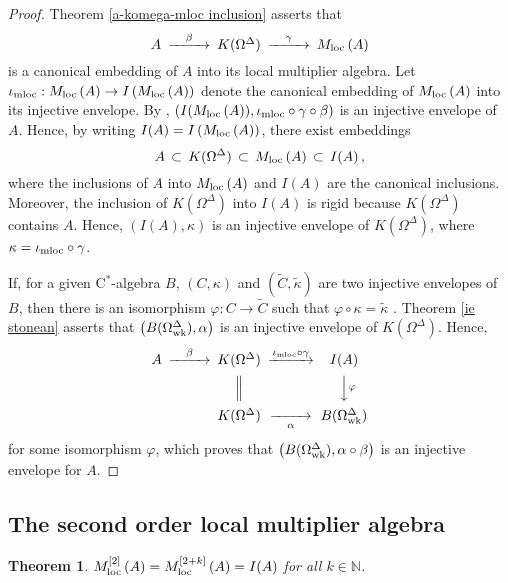 \documentclass{amsart}
\newtheorem{theorem}{Theorem}[section]
\theoremstyle{definition}
\theoremstyle{remark}
\begin{document}
\begin{proof}
Theorem \ref{a-komega-mloc inclusion} asserts that
\[
\begin{CD}
A @>\beta >> K(\Omega^\Delta)
@>\gamma>> {M_{\rm loc}\,}(A)
\end{CD}
\]
is a canonical embedding of $A$ into its local multiplier algebra.
Let $\iota_{\rm mloc}:{M_{\rm loc}\,}(A)\rightarrow I\left({M_{\rm loc}\,}(A)\right)$
denote the canonical embedding of ${M_{\rm loc}\,}(A)$ into its injective envelope.
By \cite[Theorem 5]{frank2002}, $\left( I({M_{\rm loc}\,}(A)), \iota_{\rm mloc}\circ\gamma\circ\beta\right)$ is an
injective envelope of $A$. Hence, by writing $I(A)=I\left({M_{\rm loc}\,}(A)\right)$, there exist embeddings
\begin{equation}\label{incl-1}
A\,\subset\,K(\Omega^\Delta)\, \subset \, {M_{\rm loc}\,} (A)\, \subset \,I(A)\,,
\end{equation}
where the inclusions of $A$ into ${M_{\rm loc}\,}(A)$ and $I(A)$ are the canonical inclusions.
Moreover, the inclusion of $K(\Omega^\Delta)$ into $I(A)$ is rigid because $K(\Omega^\Delta)$
contains $A$. Hence,
$\left(I(A), \kappa\right)$ is an injective envelope of $K(\Omega^\Delta)$, where $\kappa=\iota_{\rm mloc}\circ\gamma$.

If, for a given C$^*$-algebra $B$, $(C,\kappa)$ and $(\tilde C,\tilde\kappa)$ are two injective envelopes of $B$,
then there is an isomorphism $\varphi:C\rightarrow\tilde C$ such that $\varphi\circ\kappa=\tilde\kappa$ \cite[Theorem 4.1]{hamana1979a}.
Theorem \ref{ie stonean} asserts that $\left(B(\Omega_{\rm wk}^\Delta),\alpha\right)$ is an injective envelope of $K(\Omega^\Delta)$.
Hence,
\[
\begin{CD}
A @>\beta >> K(\Omega^\Delta) @>\iota_{\rm mloc}\circ\gamma >> I(A) \\
@.  @| @VV{\varphi}V \\
@. K(\Omega^\Delta)@>>{\alpha}> B(\Omega_{\rm wk}^\Delta)
\end{CD}
\]
for some isomorphism $\varphi$, which proves that
$\left(B(\Omega_{\rm wk}^\Delta), \alpha\circ\beta \right)$ is an injective envelope for $A$.
\end{proof}

\subsection{The second order local multiplier algebra}

\begin{theorem}\label{mloc-2} ${M_{\rm loc}^{[2]}\,}(A)={M_{\rm loc}^{[2+k]}\,}(A)=I(A)$ for all $k\in\mathbb N$.
\end{theorem}
\end{document}
